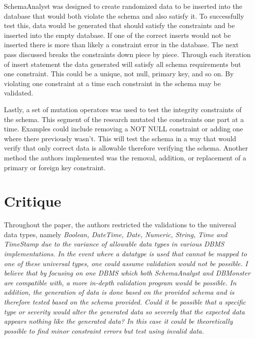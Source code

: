 \documentclass[11pt]{article}
\begin{document}
SchemaAnalyst was designed to create randomized data to be inserted into the database that would both violate the schema and also satisfy it. To successfully test this, data would be generated that should satisfy the constraints and be inserted into the empty database. If one of the correct inserts would not be inserted there is more than likely a constraint error in the database. The next pass discussed breaks the constraints down piece by piece. Through each iteration of insert statement the data generated will satisfy all schema requirements but one constraint. This could be a unique, not null, primary key, and so on. By violating one constraint at a time each constraint in the schema may be validated.

Lastly, a set of mutation operators was used to test the integrity constraints of the schema. \cite{Kapfhammer2013} This segment of the research mutated the constraints one part at a time. Examples could include removing a NOT NULL constraint or adding one where there previously wasn't. This will test the schema in a way that would verify that only correct data is allowable therefore verifying the schema. Another method the authors implemented was the removal, addition, or replacement of a primary or foreign key constraint.

\vspace*{-.1in}
\section{Critique}
\label{sec:critique}
\vspace*{-.1in}

Throughout the paper, the authors restricted the validations to the universal data types, namely \em{Boolean, DateTime, Date, Numeric, String, Time} and \em{TimeStamp} \cite{Kapfhammer2013} due to the variance of allowable data types in various DBMS implementations. In the event where a datatype is used that cannot be mapped to one of these universal types, one could assume validation would not be possible. I believe that by focusing on one DBMS which both SchemaAnalyst and DBMonster are compatible with, a more in-depth validation program would be possible. In addition, the generation of data is done based on the provided schema and is therefore tested based on the schema provided. Could it be possible that a specific type or severity would alter the generated data so severely that the expected data appears nothing like the generated data? In this case it could be theoretically possible to find minor constraint errors but test using invalid data.
\end{document}
